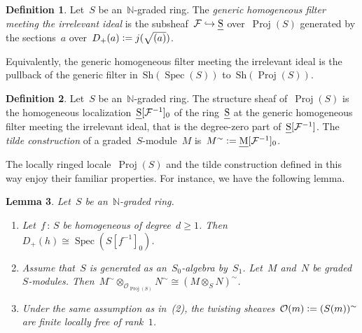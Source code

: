 \documentclass[10pt,reqno,a4paper]{amsbook}
\theoremstyle{definition}
\newtheorem{defn}{Definition}[section]
\theoremstyle{plain}
\newtheorem{lemma}[defn]{Lemma}
\theoremstyle{remark}
\newcommand{\F}{\mathcal{F}}
\renewcommand{\O}{\mathcal{O}}
\newcommand{\NN}{\mathbb{N}}
\let\oldul\ul
\renewcommand{\ul}[1]{\text{\oldul{$#1$}}}
\newcommand{\Sh}{\mathrm{Sh}}
\DeclareMathOperator{\Spec}{Spec}
\DeclareMathOperator{\Proj}{Proj}
\newcommand{\?}{\,{:}\,}
\renewcommand{\_}{\mathpunct{.}\,}
\newcommand{\defeq}{\vcentcolon=}
\begin{document}
\begin{defn}Let~$S$ be an~$\NN$-graded ring. The \emph{generic homogeneous
filter meeting the irrelevant ideal} is the subsheaf~$\F \hookrightarrow
\ul{S}$ over~$\Proj(S)$ generated by the sections~$a$ over~$D_+(a) \defeq j(\sqrt{(a)})$.
\end{defn}

Equivalently, the generic homogeneous filter meeting the irrelevant ideal is
the pullback of the generic filter in~$\Sh(\Spec(S))$ to~$\Sh(\Proj(S))$.

\begin{defn}Let~$S$ be an~$\NN$-graded ring. The structure sheaf of~$\Proj(S)$ is the homogeneous
localization~$\ul{S}[\F^{-1}]_0$ of the ring~$\ul{S}$ at the generic
homogeneous filter meeting the irrelevant ideal, that is the degree-zero part
of~$\ul{S}[\F^{-1}]$. The \emph{tilde construction} of a graded~$S$-module~$M$
is~$M^\sim \defeq \ul{M}[\F^{-1}]_0$.
\end{defn}

The locally ringed locale~$\Proj(S)$ and the tilde construction defined in this
way enjoy their familiar properties. For instance, we have the following lemma.

\begin{lemma}Let~$S$ be an~$\NN$-graded ring.
\begin{enumerate}
\item Let~$f \? S$ be homogeneous of degree~$d \geq 1$. Then~$D_+(h) \cong
\Spec(S[f^{-1}]_0)$.
\item Assume that~$S$ is generated as an~$S_0$-algebra by~$S_1$. Let~$M$
and~$N$ be graded~$S$-modules. Then~$M^\sim \otimes_{\O_{\Proj(S)}} N^\sim
\cong (M \otimes_S N)^\sim$.
\item Under the same assumption as in~(2), the twisting sheaves~$\O(m) \defeq
(S(m))^\sim$ are finite locally free of rank~$1$.
\end{enumerate}
\end{lemma}
\end{document}
